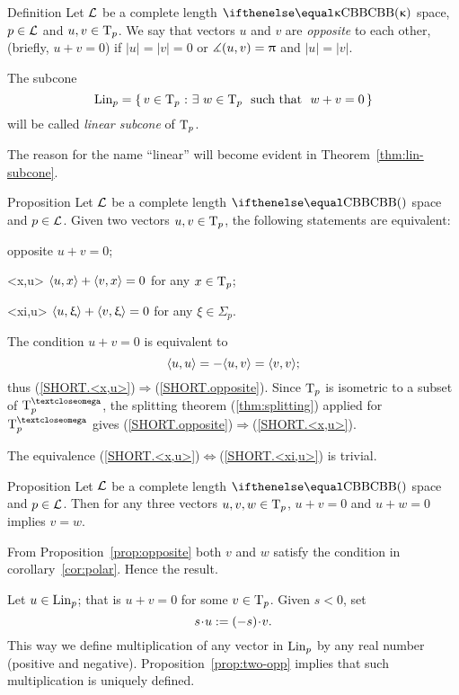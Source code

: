 \begin{thm}{Definition}\label{def:opp+Lin}
Let $\mathcal{L}$ be a complete length $\Alex{\kappa}$ space, $p\in \spc{L}$ and $u,v\in\T_p$.
We say that vectors $u$ and $v$ are \emph{opposite}\label{def:opposite:page} to each other, (briefly, $u+v=0$) if $|u|=|v|=0$ or $\measuredangle(u,v)=\uppi$ and $|u|=|v|$.

The subcone
\[\Lin_p=\set{v\in\T_p}{\exists\ w\in\T_p\ \ \t{such that}\ \ w+v=0}\]
will be called \emph{linear subcone} of $\text{\rm T}_p$.
\end{thm}

The reason for the name ``linear'' will become evident in Theorem~\ref{thm:lin-subcone}.

\begin{thm}{Proposition}\label{prop:opposite}
Let $\mathcal{L}$ be a complete length $\Alex{}$ space and $p\in \spc{L}$.
Given two vectors $u,v\in\T_p$, the following statements are equivalent:
\begin{subthm}{opposite} $u+v=0$;
\end{subthm}
\begin{subthm}{<x,u>} $\langle u,x\rangle+\langle v,x\rangle=0$ for any $x\in\T_p$;
\end{subthm}
\begin{subthm}{<xi,u>} $\langle u,\upxi\rangle+\langle v,\upxi\rangle=0$ for any $\xi\in\Sigma_p$.
\end{subthm}
\end{thm}

The condition $u+v=0$ is equivalent to 
\[\langle u,u\rangle=-\langle u,v\rangle=\langle v,v\rangle;\]
thus 
(\ref{SHORT.<x,u>})$\Rightarrow$(\ref{SHORT.opposite}).
Since $\text{\rm T}_p$ is isometric to a subset of $\T^\o_p$,
the splitting theorem (\ref{thm:splitting}) applied for $\T_p^\o$
gives (\ref{SHORT.opposite})$\Rightarrow$(\ref{SHORT.<x,u>}).

The equivalence  (\ref{SHORT.<x,u>})$\Leftrightarrow$(\ref{SHORT.<xi,u>}) is trivial.
\qeds

\begin{thm}{Proposition}\label{prop:two-opp}
Let $\mathcal{L}$  be a complete length $\Alex{}$ space and $p\in \spc{L}$.
Then for any three vectors $u,v,w\in\T_p$, $u+v=0$ and $u+ w=0$ implies $v=w$.
\end{thm}

 From Proposition~\ref{prop:opposite} both $v$ and $w$ satisfy the condition in corollary~\ref{cor:polar}. 
Hence the result.\qeds

Let $u\in \Lin_p$; that is $u+v=0$ for some $v\in\T_p$.
Given $s<0$, set 
\[s\cdot u\df (-s)\cdot v.\]
This way we define multiplication of any vector in $\mathop{\rm Lin}\nolimits_p$ by any real number (positive and negative).
Proposition~\ref{prop:two-opp} implies that such multiplication is uniquely defined.


